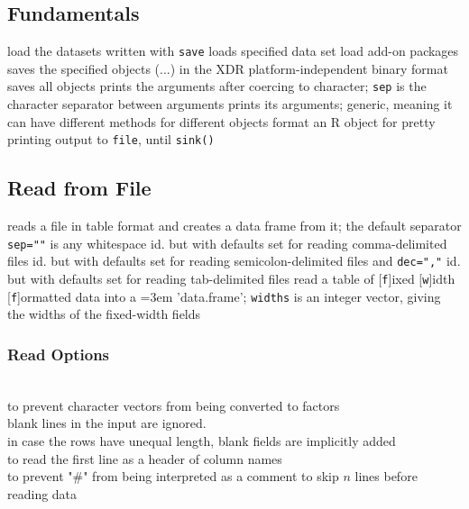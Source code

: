 \subsection{Fundamentals}{}
	{load the datasets written with {\tt save}}
	{loads specified data set}
	{load add-on packages}
	{saves the specified objects (...) in the XDR
    platform-independent binary format}
	{saves all objects}
	{prints the arguments after
    coercing to character; {\tt sep} is the character separator between arguments}
	{prints its arguments; generic, meaning it can
    have different methods for different objects}
	{format an R object for pretty printing}
	{output to {\tt file}, until {\tt sink()}}

\subsection{Read from File}{}

	{reads a file in table format and creates a data frame
from it; the default separator {\tt sep=""} is any whitespace}
	{id. but with defaults set for reading
comma-delimited files}
	{id. but with defaults set for
reading semicolon-delimited files and {\tt dec=","}}
	{id. but with defaults set for reading
tab-delimited files}
	{ read
a table of [{\tt f}]ixed [{\tt w}]idth [{\tt f}]or\-mat\-ted data into a
\emergencystretch=3em 'data.frame'; {\tt widths} is an integer vector, giving
the widths of the fixed-width fields}

\subsubsection{Read Options}{}
 {\\ to prevent character vectors from being converted to factors}
 {\\ blank lines in the input are ignored.}
 {\\ in case the rows have unequal length, blank fields are implicitly added}
 {\\ to read the first line as a header of column names}
 {\\ to prevent "\#" from being interpreted as a comment}
 {to skip $n$ lines before reading data}

